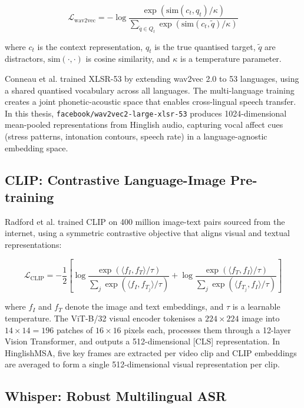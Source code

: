 \begin{equation}
\mathcal{L}_\text{wav2vec} = -\log \frac{\exp(\text{sim}(c_t, q_t)/\kappa)}{\sum_{\tilde{q} \in Q_t}\exp(\text{sim}(c_t,\tilde{q})/\kappa)}
\label{eq:wav2vec}
\end{equation}

where $c_t$ is the context representation, $q_t$ is the true quantised target, $\tilde{q}$ are distractors, $\text{sim}(\cdot, \cdot)$ is cosine similarity, and $\kappa$ is a temperature parameter.

Conneau et al. \cite{conneau2021xlsr} trained XLSR-53 by extending wav2vec 2.0 to 53 languages, using a shared quantised vocabulary across all languages. The multi-language training creates a joint phonetic-acoustic space that enables cross-lingual speech transfer. In this thesis, \texttt{facebook/wav2vec2-large-xlsr-53} produces 1024-dimensional mean-pooled representations from Hinglish audio, capturing vocal affect cues (stress patterns, intonation contours, speech rate) in a language-agnostic embedding space.

\subsection{CLIP: Contrastive Language-Image Pre-training}

Radford et al. \cite{radford2021clip} trained CLIP on 400 million image-text pairs sourced from the internet, using a symmetric contrastive objective that aligns visual and textual representations:

\begin{equation}
\mathcal{L}_\text{CLIP} = -\frac{1}{2}\left[\log\frac{\exp(\langle f_I, f_T \rangle/\tau)}{\sum_j \exp(\langle f_I, f_{T_j} \rangle/\tau)} + \log\frac{\exp(\langle f_T, f_I \rangle/\tau)}{\sum_j \exp(\langle f_{T_j}, f_I \rangle/\tau)}\right]
\label{eq:clip}
\end{equation}

where $f_I$ and $f_T$ denote the image and text embeddings, and $\tau$ is a learnable temperature. The ViT-B/32 visual encoder tokenises a $224\times 224$ image into $14\times 14 = 196$ patches of $16\times 16$ pixels each, processes them through a 12-layer Vision Transformer, and outputs a 512-dimensional [CLS] representation. In HinglishMSA, five key frames are extracted per video clip and CLIP embeddings are averaged to form a single 512-dimensional visual representation per clip.

\subsection{Whisper: Robust Multilingual ASR}

